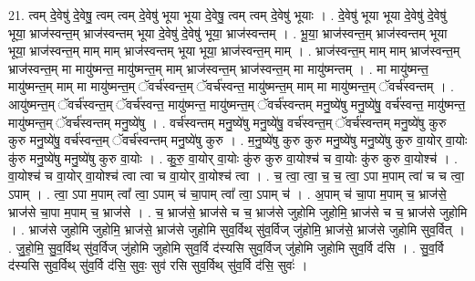 \documentclass[17pt]{extarticle}
\begin{document}
21. त्वम् दे॒वेषु॑ दे॒वेषु॒ त्वम् त्वम् दे॒वेषु॑ भूया भूया दे॒वेषु॒ त्वम् त्वम् दे॒वेषु॑ भूयाः । . दे॒वेषु॑ भूया भूया दे॒वेषु॑ दे॒वेषु॑ भूया॒ भ्राज॑स्वन्त॒म् भ्राज॑स्वन्तम् भूया दे॒वेषु॑ दे॒वेषु॑ भूया॒ भ्राज॑स्वन्तम् । . भू॒या॒ भ्राज॑स्वन्त॒म् भ्राज॑स्वन्तम् भूया भूया॒ भ्राज॑स्वन्त॒म् माम् माम् भ्राज॑स्वन्तम् भूया भूया॒ भ्राज॑स्वन्त॒म् माम् । . भ्राज॑स्वन्त॒म् माम् माम् भ्राज॑स्वन्त॒म् भ्राज॑स्वन्त॒म् मा मायु॑ष्मन्त॒ मायु॑ष्मन्त॒म् माम् भ्राज॑स्वन्त॒म् भ्राज॑स्वन्त॒म् मा मायु॑ष्मन्तम् । . मा मायु॑ष्मन्त॒ मायु॑ष्मन्त॒म् माम् मा मायु॑ष्मन्त॒म् ॅवर्च॑स्वन्त॒म् ॅवर्च॑स्वन्त॒ मायु॑ष्मन्त॒म् माम् मा मायु॑ष्मन्त॒म् ॅवर्च॑स्वन्तम् । . आयु॑ष्मन्त॒म् ॅवर्च॑स्वन्त॒म् ॅवर्च॑स्वन्त॒ मायु॑ष्मन्त॒ मायु॑ष्मन्त॒म् ॅवर्च॑स्वन्तम् मनु॒ष्ये॑षु मनु॒ष्ये॑षु॒ वर्च॑स्वन्त॒ मायु॑ष्मन्त॒ मायु॑ष्मन्त॒म् ॅवर्च॑स्वन्तम् मनु॒ष्ये॑षु । . वर्च॑स्वन्तम् मनु॒ष्ये॑षु मनु॒ष्ये॑षु॒ वर्च॑स्वन्त॒म् ॅवर्च॑स्वन्तम् मनु॒ष्ये॑षु कुरु कुरु मनु॒ष्ये॑षु॒ वर्च॑स्वन्त॒म् ॅवर्च॑स्वन्तम् मनु॒ष्ये॑षु कुरु । . म॒नु॒ष्ये॑षु कुरु कुरु मनु॒ष्ये॑षु मनु॒ष्ये॑षु कुरु वा॒योर् वा॒योः कु॑रु मनु॒ष्ये॑षु मनु॒ष्ये॑षु कुरु वा॒योः । . कु॒रु॒ वा॒योर् वा॒योः कु॑रु कुरु वा॒योश्च॑ च वा॒योः कु॑रु कुरु वा॒योश्च॑ । . वा॒योश्च॑ च वा॒योर् वा॒योश्च॑ त्वा त्वा च वा॒योर् वा॒योश्च॑ त्वा । . च॒ त्वा॒ त्वा॒ च॒ च॒ त्वा॒ ऽपा म॒पाम् त्वा॑ च च त्वा॒ ऽपाम् । . त्वा॒ ऽपा म॒पाम् त्वा᳚ त्वा॒ ऽपाम् च॑ चा॒पाम् त्वा᳚ त्वा॒ ऽपाम् च॑ । . अ॒पाम् च॑ चा॒पा म॒पाम् च॒ भ्राज॑से॒ भ्राज॑से चा॒पा म॒पाम् च॒ भ्राज॑से । . च॒ भ्राज॑से॒ भ्राज॑से च च॒ भ्राज॑से जुहोमि जुहोमि॒ भ्राज॑से च च॒ भ्राज॑से जुहोमि । . भ्राज॑से जुहोमि जुहोमि॒ भ्राज॑से॒ भ्राज॑से जुहोमि सुव॒र्विथ् सु॑व॒र्विज् जु॑होमि॒ भ्राज॑से॒ भ्राज॑से जुहोमि सुव॒र्वित् । . जु॒हो॒मि॒ सु॒व॒र्विथ् सु॑व॒र्विज् जु॑होमि जुहोमि सुव॒र्वि द॑स्यसि सुव॒र्विज् जु॑होमि जुहोमि सुव॒र्वि द॑सि । . सु॒व॒र्वि द॑स्यसि सुव॒र्विथ् सु॑व॒र्वि द॑सि॒ सुवः॒ सुव॑ रसि सुव॒र्विथ् सु॑व॒र्वि द॑सि॒ सुवः॑ । \newline
\end{document}
